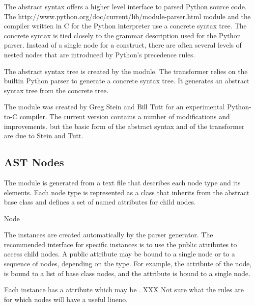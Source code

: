 The abstract syntax offers a higher level interface to parsed Python
source code.  The 
{http://www.python.org/doc/current/lib/module-parser.html}
module and the compiler written in C for the Python interpreter use a
concrete syntax tree.  The concrete syntax is tied closely to the
grammar description used for the Python parser.  Instead of a single
node for a construct, there are often several levels of nested nodes
that are introduced by Python's precedence rules.

The abstract syntax tree is created by the
 module.  The transformer relies on the
builtin Python parser to generate a concrete syntax tree.  It
generates an abstract syntax tree from the concrete tree.  

The  module was created by Greg
Stein and Bill Tutt for an
experimental Python-to-C compiler.  The current version contains a
number of modifications and improvements, but the basic form of the
abstract syntax and of the transformer are due to Stein and Tutt.

\subsection{AST Nodes}


The  module is generated from a text file that
describes each node type and its elements.  Each node type is
represented as a class that inherits from the abstract base class
 and defines a set of named attributes for
child nodes.

\begin{classdesc}{Node}{}
  
  The  instances are created automatically by the parser
  generator.  The recommended interface for specific 
  instances is to use the public attributes to access child nodes.  A
  public attribute may be bound to a single node or to a sequence of
  nodes, depending on the  type.  For example, the
   attribute of the  node, is bound to a
  list of base class nodes, and the  attribute is bound to
  a single node.
  
  Each  instance has a  attribute which may
  be .  XXX Not sure what the rules are for which nodes
  will have a useful lineno.
\end{classdesc}

